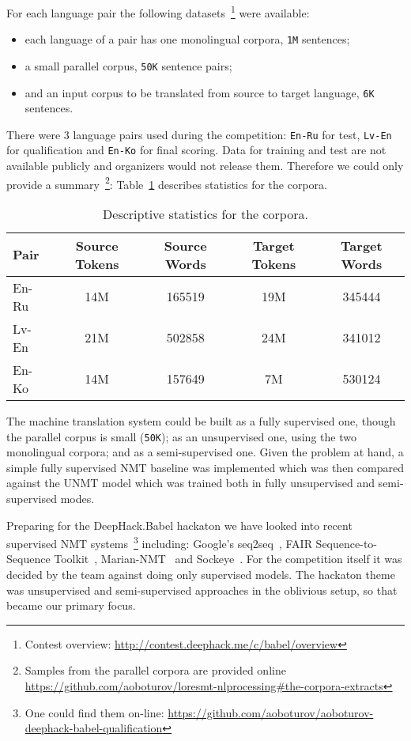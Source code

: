 \documentclass[]{article}
\begin{document}
For each language pair the following datasets~\footnote{Contest overview: \url{http://contest.deephack.me/c/babel/overview}} were available:
\begin{itemize}
  \item each language of a pair has one monolingual corpora, {\tt 1M} sentences;
  \item a small parallel corpus, {\tt 50K} sentence pairs;
  \item and an input corpus to be translated from source to target language, {\tt 6K} sentences.
\end{itemize}
There were 3 language pairs used during the competition: {\tt En-Ru} for test, {\tt Lv-En} for qualification and {\tt En-Ko} for final scoring.
Data for training and test are not available publicly and organizers would not release them.
Therefore we could only provide a summary~\footnote{Samples from the parallel corpora are provided online \url{https://github.com/aoboturov/loresmt-nlprocessing\#the-corpora-extracts}}: Table~\ref{table:corpora_stats} describes statistics for the corpora.

\begin{table}[h!]
\begin{center}
\begin{tabular}{ l c c c c }
Pair & Source Tokens & Source Words & Target Tokens & Target Words \\
\hline
En-Ru & 14M & 165519 & 19M & 345444 \\
Lv-En & 21M & 502858 & 24M & 341012 \\
En-Ko & 14M & 157649 & 7M & 530124 \\
\end{tabular}
\end{center}
\caption{Descriptive statistics for the corpora.}
\label{table:corpora_stats}
\end{table}

The machine translation system could be built as a fully supervised one, though the parallel corpus is small ({\tt 50K}); as an unsupervised one, using the two monolingual corpora; and as a semi-supervised one.
Given the problem at hand, a simple fully supervised \ac{NMT} baseline was implemented which was then compared against the \ac{UNMT} model which was trained both in fully unsupervised and semi-supervised modes.

Preparing for the {{DeepHack.Babel}} hackaton we have looked into recent supervised \ac{NMT} systems~\footnote{One could find them on-line: \url{https://github.com/aoboturov/aoboturov-deephack-babel-qualification}} including: Google's seq2seq~\citep{Britz:2017}, {FAIR Sequence-to-Sequence Toolkit}~\citep{gehring2017convs2s}, {{Marian-NMT}}~\citep{junczys2016neural} and Sockeye~\citep{Sockeye:17}.
For the competition itself it was decided by the team against doing only supervised models.
The hackaton theme was unsupervised and semi-supervised approaches in the oblivious setup, so that became our primary focus.
\end{document}
